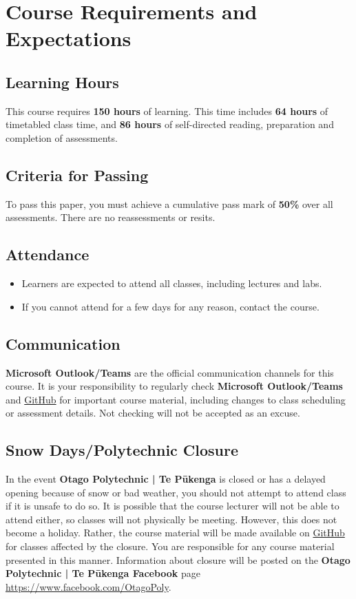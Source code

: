 \documentclass{article}
\begin{document}
\section*{Course Requirements and Expectations}

\subsection*{Learning Hours}
This course requires \textbf{150 hours} of learning. This time includes \textbf{64 hours} of timetabled class time, and \textbf{86 hours} of self-directed reading, preparation and completion of assessments.  

\subsection*{Criteria for Passing}
To pass this paper, you must achieve a cumulative pass mark of \textbf{50\%} over all assessments. There are no reassessments or resits.

\subsection*{Attendance}
\begin{itemize}
	\item Learners are expected to attend all classes, including lectures and labs.
	\item If you cannot attend for a few days for any reason, contact the course.
\end{itemize}

\subsection*{Communication}
\textbf{Microsoft Outlook/Teams} are the official communication channels for this course. It is your responsibility to regularly check \textbf{Microsoft Outlook/Teams} and \href{https://github.com/otago-polytechnic-bit-courses/ID607001-intro-app-dev-concepts}{GitHub} for important course material, including changes to class scheduling or assessment details. Not checking will not be accepted as an excuse.

\subsection*{Snow Days/Polytechnic Closure}
In the event \textbf{Otago Polytechnic | Te Pūkenga} is closed or has a delayed opening because of snow or bad weather, you should not attempt to attend class if it is unsafe to do so. It is possible that the course lecturer will not be able to attend either, so classes will not physically be meeting. However, this does not become a holiday. Rather, the course material will be made available on \href{https://github.com/otago-polytechnic-bit-courses/ID607001-intro-app-dev-concepts}{GitHub} for classes affected by the closure. You are responsible for any course material presented in this manner. Information about closure will be posted on the \textbf{Otago Polytechnic | Te Pūkenga Facebook} page \href{https://www.facebook.com/OtagoPoly}{https://www.facebook.com/OtagoPoly}.
\end{document}
